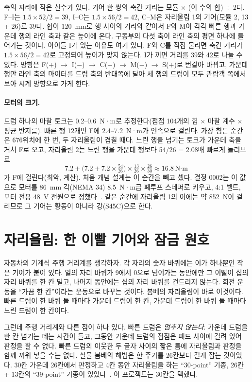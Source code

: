 축의 자리에 작은 산수가 있다. 기어 한 쌍의 축간 거리는 모듈 × (이 수의 합) ÷ 2다. F--I는 $1.5 \times 52 / 2 = 39$,
I--C는 $1.5 \times 56 / 2 = 42$, C--M은 자리올림 1의 기어(모듈 2, 13 + 26)로 39다. 합이 120~mm로 행 사이의 거리와
같아서 F와 M이 각각 빠른 행과 가운데 행의 라인 축과 같은 높이에 온다. 구동부의 다섯 축이 라인 축의 평면 하나에 들어가는
것이다. 아이들 I가 있는 이유도 여기 있다. F와 C를 직접 물리면 축간 거리가 $1.5 \times 56 / 2 = 42$로 고정되어 높이가
맞지 않는다. I가 끼면 거리를 39와 42로 나눌 수 있다. 방향은 F($+$) $\to$ I($-$) $\to$ C($+$) $\to$ M($-$) $\to$ S($+$)로
번갈아 바뀌고, 가운데 행만 라인 축의 마이터를 드럼 축의 반대쪽에 달아 세 행의 드럼이 모두 관람객 쪽에서 보아
시계 방향으로 가게 한다.

\paragraph{모터의 크기.} 드럼 하나의 마찰 토크는 0.2--0.6~N·m로 추정한다(접점 104개의 힘 × 마찰 계수 × 평균 반지름).
빠른 행 12개면 F에 2.4--7.2~N·m가 연속으로 걸린다. 가장 힘든 순간은 676위치에 한 번, 두 자리올림이 겹칠 때다. 느린
행을 넘기는 토크가 가운데 축을 거쳐 F로 오고, 자리올림 2는 느린 행을 가운데 행보다 54/26 = 2.08배 빠르게 돌리므로
\[
  7.2 + \bigl(7.2 + 7.2 \times \tfrac{54}{26}\bigr) \times \tfrac{13}{26} \times \tfrac{26}{30} \approx 16.8~\text{N·m}
\]
가 F에 걸린다(최악, 계산). 처음 개념 설계는 이 순간을 빼고 셌다. 결정 0002는 이 값으로 모터를 86~mm 각(NEMA 34)
8.5~N·m급 폐루프 스테퍼로 키우고, 4:1 벨트, 모터 전용 48~V 전원으로 정했다~\cite{leadshine-csm23485}. 같은 순간에
자리올림 1의 이에는 약 852~N이 걸리므로 그 기어는 황동이 아니라 강(S45C)으로 한다.

\section{자리올림: 한 이빨 기어와 잠금 원호}\label{sec:gm-carry}

\Why 자동차의 기계식 주행 거리계를 생각하자. 각 자리의 숫자 바퀴에는 이가 하나뿐인 작은 기어가 붙어 있다. 일의
자리 바퀴가 9에서 0으로 넘어가는 동안에만 그 이빨이 십의 자리 바퀴를 한 칸 밀고, 나머지 동안에는 십의 자리 바퀴를
건드리지 않는다. 회전 운동을 ``가끔 한 칸''이라는 운동으로 바꾸는 것이다. 봄베의 자리올림이 바로 이것이다.
빠른 드럼이 한 바퀴 돌 때마다 가운데 드럼이 한 칸, 가운데 드럼이 한 바퀴 돌 때마다 느린 드럼이 한 칸이다.

그런데 주행 거리계와 다른 점이 하나 있다. 빠른 드럼은 \emph{멈추지 않는다}. 가운데 드럼을 한 칸 넘기는 데는 시간이
들고, 그동안 가운데 드럼의 접점은 패드 사이에 걸려 있어 판정을 할 수 없다. 빠른 드럼의 이웃한 두 글자 사이의 짧은
틈에 자리올림과 판정을 함께 끼워 넣을 수는 없다. 실물 봄베의 해법은 한 주기를 26칸보다 길게 잡는 것이었다.
30칸 가운데 26칸에서 판정하고 4칸 동안 자리올림을 하는 ``30-point'' 기종, 26칸 + 13칸의 ``39-point'' 기종이
있었다~\cite{jackson-bh09,jackson-bh11,us6812report1944}. 이 프로젝트는 30칸을 택했다.

